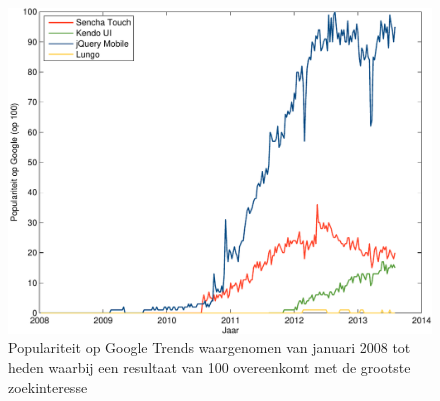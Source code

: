 \begin{figure}[H]
  \centering
  \includegraphics[width=\textwidth]{figuren/google-trends.pdf}
  \caption{Populariteit op Google Trends waargenomen van januari 2008 tot heden waarbij een resultaat van 100 overeenkomt met de grootste zoekinteresse~\cite{Google2012a}}
  \label{fig:google-trends}
\end{figure}